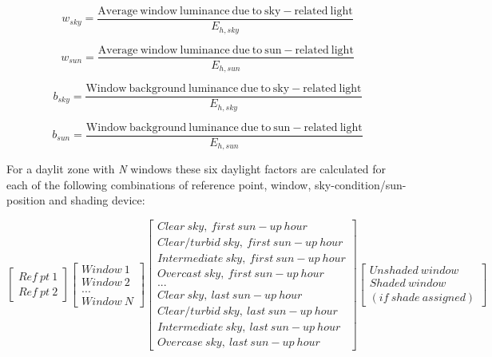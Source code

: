 \begin{equation}
{w_{sky}} = \frac{{{\mathrm{Average~window~luminance~due~to~sky-related~light}}}}{{{E_{h,sky}}}}
\end{equation}

\begin{equation}
{w_{sun}} = \frac{{{\mathrm{Average~window~luminance~due~to~sun-related~light}}}}{{{E_{h,sun}}}}
\end{equation}

\begin{equation}
{b_{sky}} = \frac{{{\mathrm{Window~background~luminance~due~to~sky-related~light}}}}{{{E_{h,sky}}}}
\end{equation}

\begin{equation}
{b_{sun}} = \frac{{{\mathrm{Window~background~luminance~due~to~sun-related~light}}}}{{{E_{h,sun}}}}
\end{equation}

For a daylit zone with \emph{N} windows these six daylight factors are calculated for each of the following combinations of reference point, window, sky-condition/sun-position and shading device:

\begin{equation}
\left[
    \begin{array}{c}
      Ref~pt~1 \\
      Ref~pt~2
    \end{array}
  \right]
  \left[
    \begin{array}{c}
      Window~1 \\
      Window~2 \\
      ... \\
      Window~N
    \end{array}
  \right]
  \left[
    \begin{array}{c}
      Clear~sky,~first~sun-up~hour \\
      Clear/turbid~sky,~first~sun-up~hour \\
      Intermediate~sky,~first~sun-up~hour \\
      Overcast~sky,~first~sun-up~hour \\
      ... \\
      Clear~sky,~last~sun-up~hour \\
      Clear/turbid~sky,~last~sun-up~hour \\
      Intermediate~sky,~last~sun-up~hour \\
      Overcase~sky,~last~sun-up~hour
    \end{array}
   \right]
   \left[
     \begin{array}{c}
       Unshaded~window \\
       Shaded~window \\
       (if~shade~assigned)
     \end{array}
   \right]
\end{equation}

